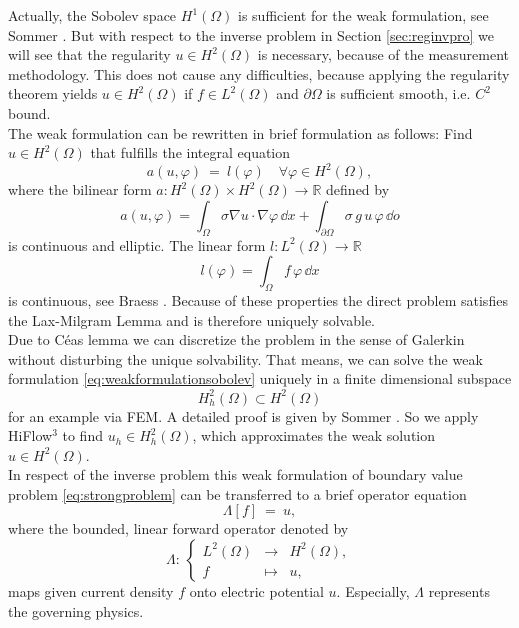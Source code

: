 \documentclass[a4paper, 11pt, twoside]{article}
\begin{document}
Actually, the Sobolev space $H^1(\Omega)$ is sufficient for the weak formulation, see Sommer \cite{bib:som12}. But with respect to the inverse problem in Section \ref{sec:reginvpro} we will see that the regularity $u\in H^2(\Omega)$ is necessary, because of the measurement methodology. This does not cause any difficulties, because applying the regularity theorem \cite[Thm.,]{bib:sal08} yields $u\in H^2(\Omega)$ if $f\in L^2(\Omega)$ and $\partial\Omega$ is sufficient smooth, i.e. $C^2$ bound.\\
The weak formulation can be rewritten in brief formulation as follows: Find $u\in H^2(\Omega)$ that fulfills the integral equation
%
\begin{equation}\label{eq:weakformulationsobolev}
	a(u,\varphi)\ =\ l(\varphi) \quad \forall \varphi \in H^2(\Omega),
\end{equation}
%
where the bilinear form $a:H^2(\Omega)\times H^2(\Omega)\rightarrow\mathbb{R}$ defined by
\begin{equation*}
	a(u,\varphi)=\int_\Omega\sigma\nabla u\cdot\nabla\varphi\,\dd x+\int_{\partial\Omega}\sigma\,g\,u\,\varphi\,\dd o  
\end{equation*}
is continuous and elliptic. The linear form $l:L^2(\Omega)\rightarrow\mathbb{R}$ 
\begin{equation*}
	l(\varphi) = \int_\Omega f\, \varphi\, \dd x
\end{equation*}
is continuous, see Braess \cite[Def.]{bib:bra03}. Because of these properties the direct problem satisfies the Lax-Milgram Lemma \cite{bib:gil01} and is therefore uniquely solvable.\\
Due to C\'{e}as lemma \cite{bib:bra03} we can discretize the problem in the sense of Galerkin without disturbing the unique solvability. That means, we can solve the weak formulation \eqref{eq:weakformulationsobolev} uniquely in a finite dimensional subspace
%
\[H^2_h(\Omega)\subset H^2(\Omega)\]
%
for an example via FEM. A detailed proof is given by Sommer \cite{bib:som12}. So we apply HiFlow$^3$ to find $u_h \in H^2_h(\Omega)$, which approximates the weak solution $u\in H^2(\Omega)$.\\

In respect of the inverse problem this weak formulation of boundary value problem \eqref{eq:strongproblem} can be transferred to a brief operator equation
\begin{equation}\label{eq:Af=u}
 \Lambda[f]\ =\ u,
\end{equation}
where the bounded, linear forward operator denoted by 
\begin{equation*}
	\Lambda:\,\left\{\begin{array}{ccc}
	L^2(\Omega) &\to &H^2(\Omega),\\
	f &\mapsto &u,
\end{array}\right.
\end{equation*}
maps given current density $f$ onto electric potential $u$. Especially, $\Lambda$ represents the governing physics. 
%
%
\end{document}
